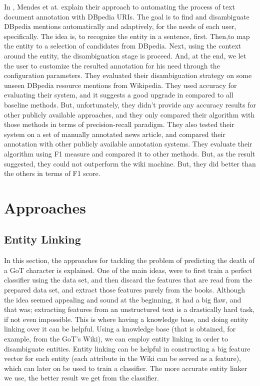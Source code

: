 \documentclass[letterpaper]{article}
\begin{document}
In \cite{dbpedia}, Mendes et at. explain their approach to automating the process of text document annotation with DBpedia URIs. The goal is to find and disambiguate DBpedia mentions automatically and adaptively, for the needs of each user, specifically. The idea is, to recognize the entity in a sentence, first. Then,to map the entity to a selection of candidates from DBpedia. Next, using the context around the entity, the disambiguation stage is proceed. And, at the end, we let the user to customize the resulted annotation for his need through the configuration parameters. They evaluated their disambiguation strategy on some unseen DBpedia resource mentions from Wikipedia. They used accuracy for evaluating their system, and it suggests a good upgrade in compared to all baseline methods. But, unfortunately, they didn't provide any accuracy results for other publicly available approaches, and they only compared their algorithm with those methods in terms of precision-recall paradigm. They also tested their system on a set of manually annotated news article, and compared their annotation with other publicly available annotation systems. They evaluate their algorithm using F1 measure and compared it to other methods. But, as the result suggested, they could not outperform the wiki machine. But, they did better than the others in terms of F1 score.


\section{Approaches} \label{sec:approach}

\subsection{Entity Linking}

In this section, the approaches for tackling the problem of predicting the death of a GoT character is explained. One of the main ideas, were to first train a perfect classifier using the data set, and then discard the features that are read from the prepared data set, and extract those features purely from the books. Although the idea seemed appealing and sound at the beginning, it had a big flaw, and that was; extracting features from an unstructured text is a drastically hard task, if not even impossible. This is where having a knowledge base, and doing entity linking over it can be helpful. Using a knowledge base (that is obtained, for example, from the GoT's Wiki), we can employ entity linking in order to disambiguate entities. Entity linking can be helpful in constructing a big feature vector for each entity (each attribute in the Wiki can be served as a feature), which can later on be used to train a classifier. The more accurate entity linker we use, the better result we get from the classifier.
\end{document}

